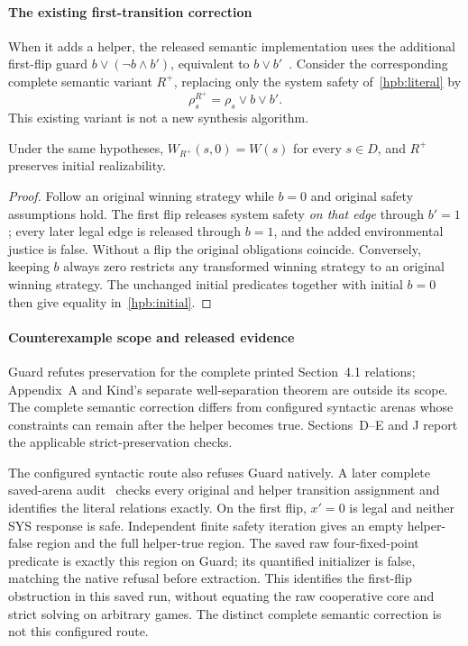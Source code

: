 \paragraph{The existing first-transition correction}
When it adds a helper, the released semantic implementation uses the
additional first-flip guard $b\lor(\neg b\land b')$, equivalent to $b\lor b'$~\cite{spectrarelease2024}.
Consider the corresponding complete semantic variant $R^+$, replacing
only the system safety of~\eqref{hpb:literal} by
\begin{equation}
 \rho_s^{R^+}=\rho_s\lor b\lor b'.
 \label{hpb:corrected}
\end{equation}
This existing variant is not a new synthesis algorithm.
\begin{proposition}
\label{hpb:corrected-preservation}
Under the same hypotheses, $W_{R^+}(s,0)=W(s)$ for every $s\in D$,
and $R^+$ preserves initial realizability.
\end{proposition}
\begin{proof}
Follow an original winning strategy while $b=0$ and original
safety assumptions hold. The first flip releases system safety
\emph{on that edge} through $b'=1$; every later legal edge is released
through $b=1$, and the added environmental justice is false.
Without a flip the original obligations coincide. Conversely, keeping
$b$ always zero restricts any transformed winning strategy to an
original winning strategy. The unchanged initial predicates together
with initial $b=0$ then give equality in~\eqref{hpb:initial}.
\end{proof}

\paragraph{Counterexample scope and released evidence}
Guard refutes preservation for the complete printed Section~4.1
relations; Appendix~A and Kind's separate well-separation theorem are
outside its scope. The complete semantic correction differs from configured syntactic
arenas whose constraints can remain after the helper becomes true.
Sections~D--E and J report the applicable strict-preservation checks.

The configured syntactic route also refuses Guard natively. A later
complete saved-arena audit~\cite{newartifact} checks every original and helper
transition assignment and identifies the literal relations exactly. On the first
flip, $x'=0$ is legal and neither SYS response is safe. Independent
finite safety iteration gives an empty helper-false region and the full
helper-true region. The saved raw four-fixed-point predicate is exactly
this region on Guard; its quantified initializer is false, matching the
native refusal before extraction. This identifies the first-flip
obstruction in this saved run, without equating the raw cooperative
core and strict solving on arbitrary games. The distinct complete
semantic correction is not this configured route.


